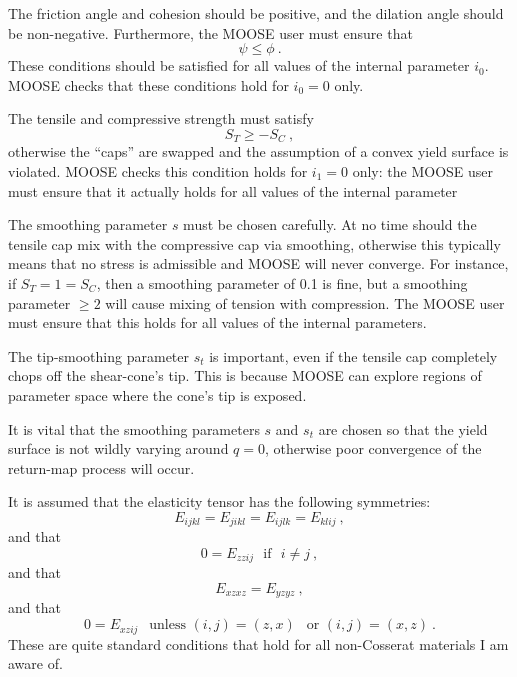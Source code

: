 \documentclass[]{scrreprt}
\begin{document}
The friction angle and cohesion should be positive, and the dilation
angle should be non-negative.  Furthermore, the MOOSE user must ensure that
\begin{equation}
\psi \leq \phi \ .
\end{equation}
These conditions should be satisfied for all values of the internal
parameter $i_{0}$.  MOOSE checks that these conditions hold for
$i_{0}=0$ only.

The tensile and compressive strength must satisfy
\begin{equation}
S_{T} \geq -S_{C} \ ,
\end{equation}
otherwise the ``caps'' are swapped and the assumption of a convex
yield surface is violated.  MOOSE checks this condition holds for
$i_{1}=0$ only: the MOOSE user must ensure that it actually holds for
all values of the internal parameter

The smoothing parameter $s$ must be chosen carefully.  At no time should
the tensile cap mix with the compressive cap via smoothing, otherwise
this typically means that no stress is admissible and MOOSE will never
converge.  For instance, if $S_{T}=1=S_{C}$, then a smoothing
parameter of 0.1 is fine, but a smoothing parameter $\geq 2$ will
cause mixing of tension with compression.  The MOOSE user must ensure
that this holds for all values of the internal parameters.

The tip-smoothing parameter $s_{t}$ is important, even if the tensile cap
completely chops off the shear-cone's tip.  This is because MOOSE can
explore regions of parameter space where the cone's tip is exposed.

It is vital that the smoothing parameters $s$ and $s_{t}$ are chosen so
that the yield surface is not wildly varying around $q=0$, otherwise
poor convergence of the return-map process will occur.

It is assumed that the elasticity tensor has the following symmetries:
\begin{equation}
E_{ijkl} = E_{jikl} = E_{ijlk} = E_{klij} \ ,
\label{eqn.elas.symms}
\end{equation}
and that
\begin{equation}
0 = E_{zzij} \ \ \ \mbox{if}\ \ \ i\neq j \ ,
\end{equation}
and that
\begin{equation}
E_{xzxz} = E_{yzyz} \ ,
\end{equation}
and that
\begin{equation}
0 = E_{xzij} \ \ \mbox{ unless } (i, j) = (z, x) \ \ \mbox{ or } (i,
j) = (x, z) \ .
\label{eqn.elas.xz.con}
\end{equation}
These are quite standard conditions that hold for all non-Cosserat
materials I am aware of.
\end{document}
